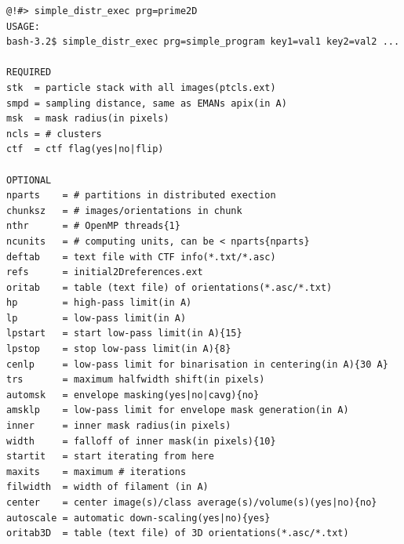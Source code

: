\documentclass[a4paper,11pt]{article}
\begin{document}
\begin{verbatim}
@!#> simple_distr_exec prg=prime2D
USAGE:
bash-3.2$ simple_distr_exec prg=simple_program key1=val1 key2=val2 ...

REQUIRED
stk  = particle stack with all images(ptcls.ext)
smpd = sampling distance, same as EMANs apix(in A)
msk  = mask radius(in pixels)
ncls = # clusters
ctf  = ctf flag(yes|no|flip)

OPTIONAL
nparts    = # partitions in distributed exection
chunksz   = # images/orientations in chunk
nthr      = # OpenMP threads{1}
ncunits   = # computing units, can be < nparts{nparts}
deftab    = text file with CTF info(*.txt/*.asc)
refs      = initial2Dreferences.ext
oritab    = table (text file) of orientations(*.asc/*.txt)
hp        = high-pass limit(in A)
lp        = low-pass limit(in A)
lpstart   = start low-pass limit(in A){15}
lpstop    = stop low-pass limit(in A){8}
cenlp     = low-pass limit for binarisation in centering(in A){30 A}
trs       = maximum halfwidth shift(in pixels)
automsk   = envelope masking(yes|no|cavg){no}
amsklp    = low-pass limit for envelope mask generation(in A)
inner     = inner mask radius(in pixels)
width     = falloff of inner mask(in pixels){10}
startit   = start iterating from here
maxits    = maximum # iterations
filwidth  = width of filament (in A)
center    = center image(s)/class average(s)/volume(s)(yes|no){no}
autoscale = automatic down-scaling(yes|no){yes}
oritab3D  = table (text file) of 3D orientations(*.asc/*.txt)
\end{verbatim}
\end{document}
